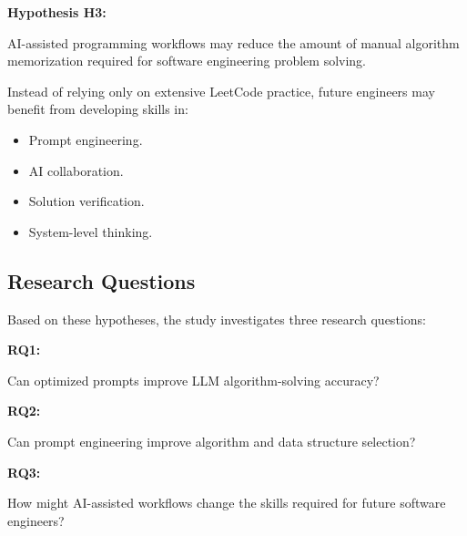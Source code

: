 \textbf{Hypothesis H3:}

AI-assisted programming workflows may reduce the amount of manual algorithm
memorization required for software engineering problem solving.


Instead of relying only on extensive LeetCode practice, future engineers may
benefit from developing skills in:

\begin{itemize}

\item Prompt engineering.

\item AI collaboration.

\item Solution verification.

\item System-level thinking.

\end{itemize}



\subsection{Research Questions}


Based on these hypotheses, the study investigates three research questions:


\textbf{RQ1:}

Can optimized prompts improve LLM algorithm-solving accuracy?



\textbf{RQ2:}

Can prompt engineering improve algorithm and data structure selection?



\textbf{RQ3:}

How might AI-assisted workflows change the skills required for future software
engineers?


